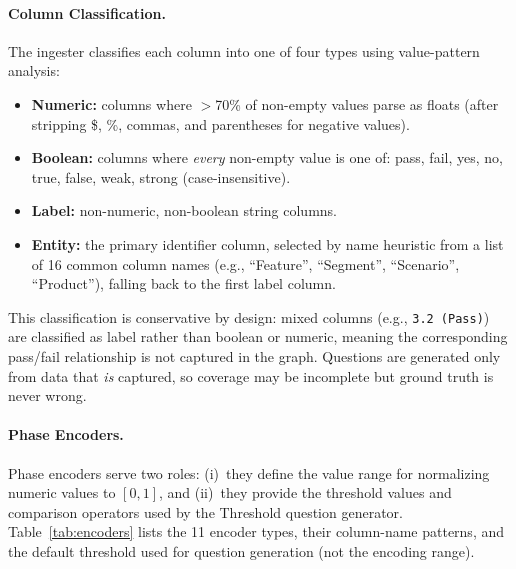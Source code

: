 \documentclass[11pt]{article}
\begin{document}
\paragraph{Column Classification.}
The ingester classifies each column into one of four types using
value-pattern analysis:
\begin{itemize}[leftmargin=2em]
  \item \textbf{Numeric:} columns where $>$70\% of non-empty values parse
    as floats (after stripping \$, \%, commas, and parentheses for negative
    values).
  \item \textbf{Boolean:} columns where \emph{every} non-empty value is
    one of: pass, fail, yes, no, true, false, weak, strong
    (case-insensitive).
  \item \textbf{Label:} non-numeric, non-boolean string columns.
  \item \textbf{Entity:} the primary identifier column, selected by name
    heuristic from a list of 16 common column names (e.g., ``Feature'',
    ``Segment'', ``Scenario'', ``Product''), falling back to the first
    label column.
\end{itemize}

\noindent
This classification is conservative by design: mixed columns (e.g.,
\texttt{3.2~(Pass)}) are classified as label rather than boolean or
numeric, meaning the corresponding pass/fail relationship is not
captured in the graph.  Questions are generated only from data
that \emph{is} captured, so coverage may be incomplete but ground
truth is never wrong.

\paragraph{Phase Encoders.}
Phase encoders serve two roles: (i)~they define the value range for
normalizing numeric values to $[0, 1]$, and (ii)~they provide the
threshold values and comparison operators used by the Threshold
question generator.
Table~\ref{tab:encoders} lists the 11 encoder types, their
column-name patterns, and the default threshold used for question
generation (not the encoding range).
\end{document}
